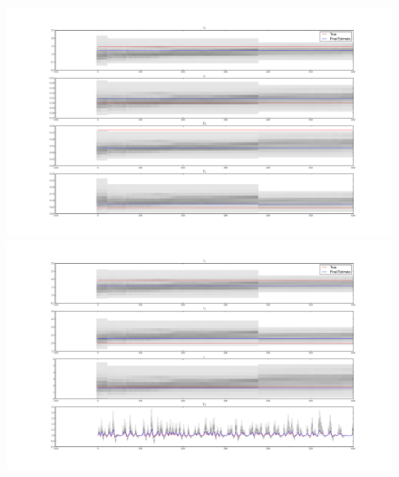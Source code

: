 \begin{figure}
\subfigure
{\includegraphics[clip=true,trim=7cm 3cm 6cm 3cm, width=\textwidth]{images/converge_lownoise1}}
\subfigure
{\includegraphics[clip=true,trim=7cm 3cm 6cm 3cm, width=\textwidth]{images/converge_lownoise2}}
\end{figure}

